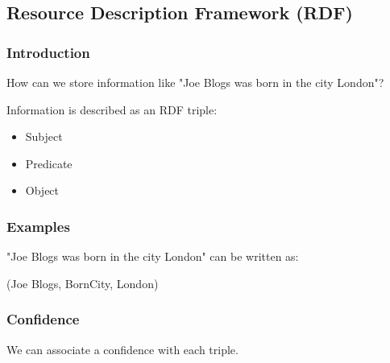 
\subsection{Resource Description Framework (RDF)}

\subsubsection{Introduction}

How can we store information like "Joe Blogs was born in the city London"?

Information is described as an RDF triple:

\begin{itemize}
\item Subject
\item Predicate
\item Object
\end{itemize}

\subsubsection{Examples}

"Joe Blogs was born in the city London" can be written as:

(Joe Blogs, BornCity, London)

\subsubsection{Confidence}

We can associate a confidence with each triple.

